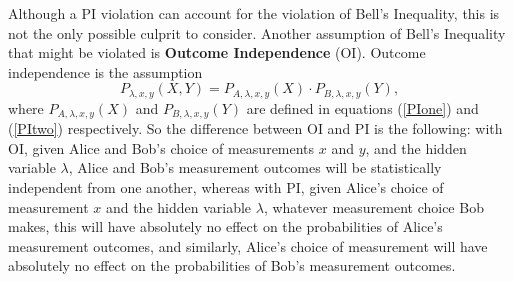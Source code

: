 \documentclass[12pt]{report}
\begin{document}
Although a PI violation can account for the violation of Bell's Inequality, this is not the only possible culprit to consider. Another assumption of Bell's Inequality that might be violated is \textbf{Outcome Independence} (OI). Outcome independence is the assumption
\begin{equation}\label{OI}
P_{\lambda,x,y}(X,Y)=P_{A,\lambda,x,y}(X)\cdot P_{B,\lambda,x,y}(Y),
\end{equation}
where $P_{A,\lambda,x,y}(X)$ and $P_{B,\lambda,x,y}(Y)$ are defined in equations (\ref{PIone}) and (\ref{PItwo}) respectively.
So the difference between OI and PI is the following: with OI, given Alice and Bob's choice of measurements $x$ and $y$, and the hidden variable $\lambda$, Alice and Bob's measurement outcomes will be statistically independent from one another, whereas with PI, given Alice's choice of measurement $x$ and the hidden variable $\lambda$, whatever measurement choice Bob makes, this will have absolutely no effect on the probabilities of Alice's measurement outcomes, and similarly, Alice's choice of measurement will have absolutely no effect on the probabilities of Bob's measurement outcomes.  
\end{document}
